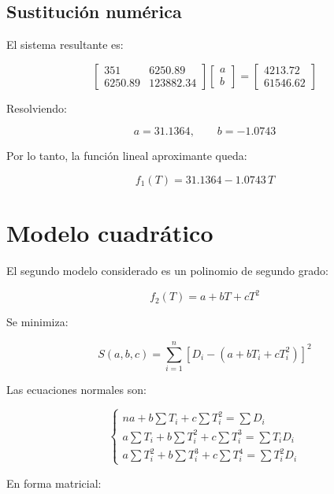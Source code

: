 \documentclass[12pt,a4paper]{article}
\newcommand{\modeloCuadratico}{f_2(T)=a+bT+cT^2}
\begin{document}
\subsection{Sustitución numérica}

\begin{table}[H]
\centering
\caption{Sumas utilizadas en el ajuste lineal}

\end{table}

El sistema resultante es:

\[
\begin{bmatrix}
\num{351} & \num{6250.89} \\
\num{6250.89} & \num{123882.34}
\end{bmatrix}
\begin{bmatrix}
a \\
b
\end{bmatrix}
=
\begin{bmatrix}
\num{4213.72} \\
\num{61546.62}
\end{bmatrix}
\]

Resolviendo:

\[
    a = \boxed{\num{31.1364}},
    \qquad
    b = \boxed{\num{-1.0743}}
\]

Por lo tanto, la función lineal aproximante queda:

\[
    f_1(T)=\boxed{\num{31.1364} - \num{1.0743}\,T}
\]

\section{Modelo cuadrático}

El segundo modelo considerado es un polinomio de segundo grado:

\[
    \modeloCuadratico
\]

Se minimiza:

\[
    S(a,b,c)=\sum_{i=1}^{n}\left[D_i-(a+bT_i+cT_i^2)\right]^2
\]

Las ecuaciones normales son:

\[
\begin{cases}
na + b\sum T_i + c\sum T_i^2 = \sum D_i \\
a\sum T_i + b\sum T_i^2 + c\sum T_i^3 = \sum T_iD_i \\
a\sum T_i^2 + b\sum T_i^3 + c\sum T_i^4 = \sum T_i^2D_i
\end{cases}
\]

En forma matricial:
\end{document}
